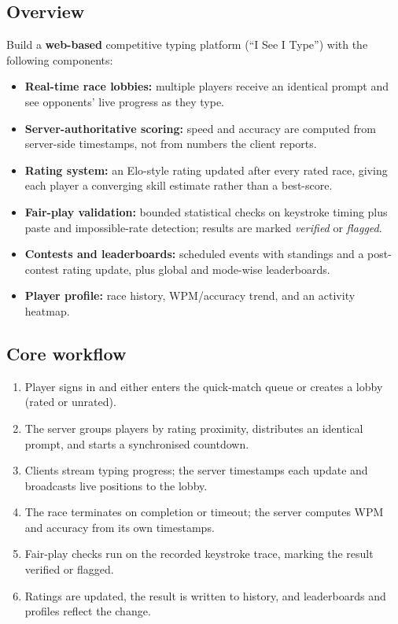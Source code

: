 \documentclass[11pt,a4paper]{article}
\begin{document}
\subsection{Overview}
Build a \textbf{web-based} competitive typing platform
(``I See I Type'') with the following components:
\begin{itemize}[leftmargin=0.7cm]
    \item \textbf{Real-time race lobbies:} multiple players receive an identical prompt and see opponents' live progress as they type.
    \item \textbf{Server-authoritative scoring:} speed and accuracy are computed from server-side timestamps, not from numbers the client reports.
    \item \textbf{Rating system:} an Elo-style rating updated after every rated race, giving each player a converging skill estimate rather than a best-score.
    \item \textbf{Fair-play validation:} bounded statistical checks on keystroke timing plus paste and impossible-rate detection; results are marked \emph{verified} or \emph{flagged}.
    \item \textbf{Contests and leaderboards:} scheduled events with standings and a post-contest rating update, plus global and mode-wise leaderboards.
    \item \textbf{Player profile:} race history, WPM/accuracy trend, and an activity heatmap.
\end{itemize}

\subsection{Core workflow}
\begin{enumerate}[leftmargin=0.7cm]
    \item Player signs in and either enters the quick-match queue or creates a lobby (rated or unrated).
    \item The server groups players by rating proximity, distributes an identical prompt, and starts a synchronised countdown.
    \item Clients stream typing progress; the server timestamps each update and broadcasts live positions to the lobby.
    \item The race terminates on completion or timeout; the server computes WPM and accuracy from its own timestamps.
    \item Fair-play checks run on the recorded keystroke trace, marking the result verified or flagged.
    \item Ratings are updated, the result is written to history, and leaderboards and profiles reflect the change.
\end{enumerate}
\end{document}
